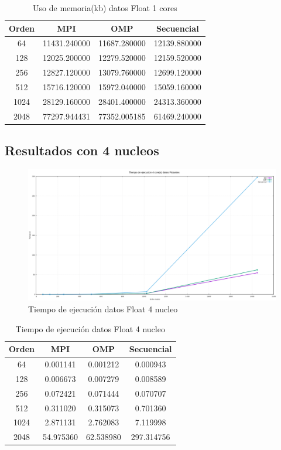 \documentclass[10pt]{IEEEtran}
\begin{document}
\begin{table}[H]
  \caption{Uso de memoria(kb) datos Float 1 cores}
  \label{table_example}
  \centering
  \begin{tabular}{|c|c|c|c|}
    \hline
    \textbf{Orden} & \textbf{MPI} & \textbf{OMP} & \textbf{Secuencial} \\
    \hline
    64 & 11431.240000 & 11687.280000 & 12139.880000 \\
    128 & 12025.200000 & 12279.520000 & 12159.520000 \\
    256 & 12827.120000 & 13079.760000 & 12699.120000 \\
    512 & 15716.120000 & 15972.040000 & 15059.160000 \\
    1024 & 28129.160000 & 28401.400000 & 24313.360000 \\
    2048 & 77297.944431 & 77352.005185 & 61469.240000 \\
    \hline
  \end{tabular}
\end{table}

\subsection{Resultados con 4 nucleos}

\begin{figure}[H]
  \centering
  \includegraphics[width=0.95\linewidth]{figs/4nucleosFlotantesTiempo.png}
  \caption{Tiempo de ejecución datos Float 4 nucleo}
  \label{fig:f}
\end{figure}

\begin{table}[H]
  \caption{Tiempo de ejecución datos Float 4 nucleo}
  \label{table_example}
  \centering
  \begin{tabular}{|c|c|c|c|}
    \hline
    \textbf{Orden} & \textbf{MPI} & \textbf{OMP} & \textbf{Secuencial} \\
    \hline
    64 & 0.001141 & 0.001212 & 0.000943 \\
    128 & 0.006673 & 0.007279 & 0.008589 \\
    256 & 0.072421 & 0.071444 & 0.070707 \\
    512 & 0.311020 & 0.315073 & 0.701360 \\
    1024 & 2.871131 & 2.762083 & 7.119998 \\
    2048 & 54.975360 & 62.538980 & 297.314756 \\
    \hline
  \end{tabular}
\end{table}
\end{document}
